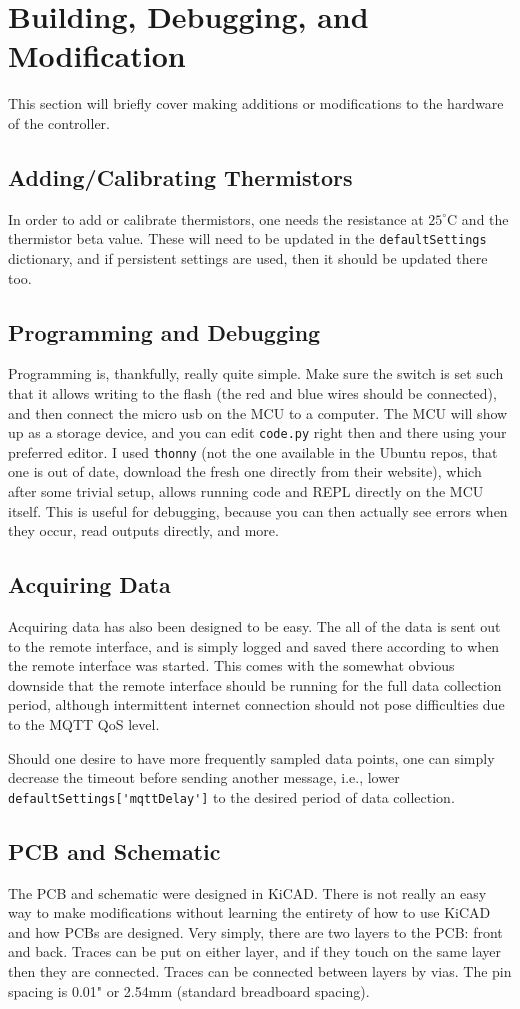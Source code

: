 \documentclass[11pt, letterpaper]{article}
\begin{document}
\section{Building, Debugging, and Modification}
This section will briefly cover making additions or modifications to the hardware of the controller.

\subsection{Adding/Calibrating Thermistors}
In order to add or calibrate thermistors, one needs the resistance at $25^{\circ}$C and the thermistor beta value. These will need to be updated in the \verb|defaultSettings| dictionary, and if persistent settings are used, then it should be updated there too.

\subsection{Programming and Debugging}
Programming is, thankfully, really quite simple. Make sure the switch is set such that it allows writing to the flash (the red and blue wires should be connected), and then connect the micro usb on the MCU to a computer. The MCU will show up as a storage device, and you can edit \verb|code.py| right then and there using your preferred editor. I used \verb|thonny| (not the one available in the Ubuntu repos, that one is out of date, download the fresh one directly from their website), which after some trivial setup, allows running code and REPL directly on the MCU itself. This is useful for debugging, because you can then actually see errors when they occur, read outputs directly, and more. 

\subsection{Acquiring Data}
Acquiring data has also been designed to be easy. The all of the data is sent out to the remote interface, and is simply logged and saved there according to when the remote interface was started. This comes with the somewhat obvious downside that the remote interface should be running for the full data collection period, although intermittent internet connection should not pose difficulties due to the MQTT QoS level. 

Should one desire to have more frequently sampled data points, one can simply decrease the timeout before sending another message, i.e., lower \verb|defaultSettings['mqttDelay']| to the desired period of data collection.

\subsection{PCB and Schematic}
The PCB and schematic were designed in KiCAD. There is not really an easy way to make modifications without learning the entirety of how to use KiCAD and how PCBs are designed. Very simply, there are two layers to the PCB: front and back. Traces can be put on either layer, and if they touch on the same layer then they are connected. Traces can be connected between layers by vias. The pin spacing is 0.01" or 2.54mm (standard breadboard spacing). 
\end{document}
